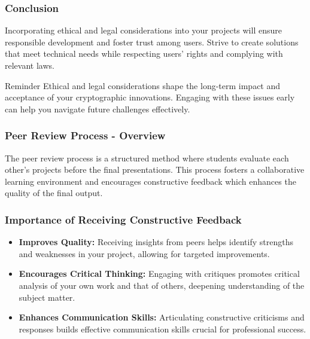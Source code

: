 \documentclass{beamer}
\begin{document}
\begin{frame}[fragile]
    \frametitle{Conclusion}
    Incorporating ethical and legal considerations into your projects will ensure responsible development and foster trust among users. 
    Strive to create solutions that meet technical needs while respecting users' rights and complying with relevant laws.

    \begin{block}{Reminder}
        Ethical and legal considerations shape the long-term impact and acceptance of your cryptographic innovations. 
        Engaging with these issues early can help you navigate future challenges effectively.
    \end{block}
\end{frame}

\begin{frame}[fragile]
    \frametitle{Peer Review Process - Overview}
    The peer review process is a structured method where students evaluate each other’s projects before the final presentations. This process fosters a collaborative learning environment and encourages constructive feedback which enhances the quality of the final output.
\end{frame}

\begin{frame}[fragile]
    \frametitle{Importance of Receiving Constructive Feedback}
    \begin{itemize}
        \item \textbf{Improves Quality:} 
        Receiving insights from peers helps identify strengths and weaknesses in your project, allowing for targeted improvements.
        
        \item \textbf{Encourages Critical Thinking:} 
        Engaging with critiques promotes critical analysis of your own work and that of others, deepening understanding of the subject matter.

        \item \textbf{Enhances Communication Skills:} 
        Articulating constructive criticisms and responses builds effective communication skills crucial for professional success.
    \end{itemize}
\end{frame}
\end{document}
